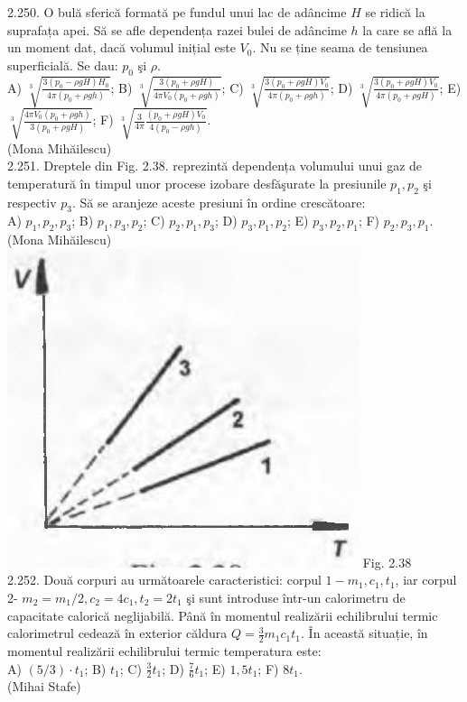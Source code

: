 2.250. O bulă sferică formată pe fundul unui lac de adâncime $H$ se ridică la suprafața apei. Să se afle dependența razei bulei de adâncime $h$ la care se află la un moment dat, dacă volumul inițial este $V_{0}$. Nu se ține seama de tensiunea superficială. Se dau: $p_{0}$ şi $\rho$.\\ A) $\sqrt[3]{\frac{3\left(p_{0}-\rho g H\right) H_{0}}{4 \pi\left(p_{0}+\rho g h\right)}}$; B) $\sqrt[3]{\frac{3\left(p_{0}+\rho g H\right)}{4 \pi V_{0}\left(p_{0}+\rho g h\right)}}$; C) $\sqrt[3]{\frac{3\left(p_{0}+\rho g H\right) V_{0}}{4 \pi\left(p_{0}+\rho g h\right)}}$; D) $\sqrt[3]{\frac{3\left(p_{0}+\rho g H\right) V_{0}}{4 \pi\left(p_{0}+\rho g H\right)}}$; E) $\sqrt[3]{\frac{4 \pi V_{0}\left(p_{0}+\rho g h\right)}{3\left(p_{0}+\rho g H\right)}}$; F) $\sqrt[3]{\frac{3}{4 \pi} \frac{\left(p_{0}+\rho g H\right) V_{0}}{4\left(p_{0}-\rho g h\right)}}$.\\ (Mona Mihăilescu)\\

2.251. Dreptele din Fig. 2.38. reprezintă dependența volumului unui gaz de temperatură în timpul unor procese izobare desfăşurate la presiunile $p_{1}, p_{2}$ şi respectiv $p_{3}$. Să se aranjeze aceste presiuni în ordine crescătoare:\\ A) $p_{1}, p_{2}, p_{3}$; B) $p_{1}, p_{3}, p_{2}$; C) $p_{2}, p_{1}, p_{3}$; D) $p_{3}, p_{1}, p_{2}$; E) $p_{3}, p_{2}, p_{1}$; F) $p_{2}, p_{3}, p_{1}$.\\ (Mona Mihăilescu)\\ \includegraphics[width=0.4\linewidth]{images/2025_07_01_5b3ff9fa0d508c8e9f17g-130} Fig. 2.38\\

2.252. Două corpuri au următoarele caracteristici: corpul $1-m_{1}, c_{1}, t_{1}$, iar corpul 2- $m_{2}=m_{1} / 2, c_{2}=4 c_{1}, t_{2}=2 t_{1}$ şi sunt introduse într-un calorimetru de capacitate calorică neglijabilă. Până în momentul realizării echilibrului termic calorimetrul cedează în exterior căldura $Q=\frac{3}{2} m_{1} c_{1} t_{1}$. În această situație, în momentul realizării echilibrului termic temperatura este:\\ A) $(5 / 3) \cdot t_{1}$; B) $t_{1}$; C) $\frac{3}{2} t_{1}$; D) $\frac{7}{6} t_{1}$; E) $1,5 t_{1}$; F) $8 t_{1}$.\\ (Mihai Stafe)\\

